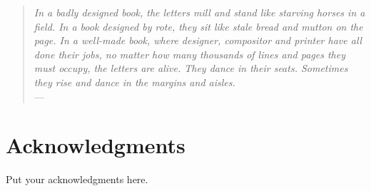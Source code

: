 
\begin{quote}{\slshape    
    In a badly designed book, the letters mill 
    and stand like starving horses in a field.
    In a book designed by rote, they sit 
    like stale bread and mutton on the page. 
    In a well-made book, where designer, compositor
    and printer have all done their jobs, 
    no matter how many thousands of lines and pages 
    they must occupy, the letters are alive. 
    They dance in their seats. 
    Sometimes they rise and dance in the margins and aisles. } \\ \medskip
    ---  \citep{Bringhurst2008}
\end{quote}



\bigskip

\begingroup
\let\clearpage\relax
\let\cleardoublepage\relax
\let\cleardoublepage\relax
\chapter*{Acknowledgments}
Put your acknowledgments here.




\endgroup



